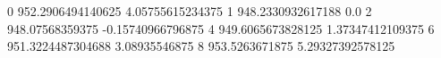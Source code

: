 0 952.2906494140625 4.05755615234375
1 948.2330932617188 0.0
2 948.07568359375 -0.15740966796875
4 949.6065673828125 1.37347412109375
6 951.3224487304688 3.08935546875
8 953.5263671875 5.29327392578125
